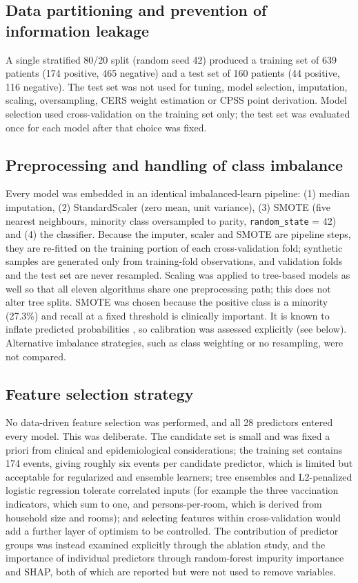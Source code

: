 \documentclass[a4paper,fleqn]{cas-dc}
\begin{document}
\subsection{Data partitioning and prevention of information leakage}
\label{sec:part}

A single stratified 80/20 split (random seed 42) produced a training set of 639 patients (174 positive, 465 negative) and a test set of 160 patients (44 positive, 116 negative). The test set was not used for tuning, model selection, imputation, scaling, oversampling, CERS weight estimation or CPSS point derivation. Model selection used cross-validation on the training set only; the test set was evaluated once for each model after that choice was fixed.

\subsection{Preprocessing and handling of class imbalance}
\label{sec:prep}

Every model was embedded in an identical imbalanced-learn pipeline: (1) median imputation, (2) StandardScaler (zero mean, unit variance), (3) SMOTE \cite{r17} (five nearest neighbours, minority class oversampled to parity, \texttt{random\_\allowbreak state} = 42) and (4) the classifier. Because the imputer, scaler and SMOTE are pipeline steps, they are re-fitted on the training portion of each cross-validation fold; synthetic samples are generated only from training-fold observations, and validation folds and the test set are never resampled. Scaling was applied to tree-based models as well so that all eleven algorithms share one preprocessing path; this does not alter tree splits. SMOTE was chosen because the positive class is a minority (27.3\%) and recall at a fixed threshold is clinically important. It is known to inflate predicted probabilities \cite{r30}, so calibration was assessed explicitly (see below). Alternative imbalance strategies, such as class weighting or no resampling, were not compared.

\subsection{Feature selection strategy}
\label{sec:fsel}

No data-driven feature selection was performed, and all 28 predictors entered every model. This was deliberate. The candidate set is small and was fixed a priori from clinical and epidemiological considerations; the training set contains 174 events, giving roughly six events per candidate predictor, which is limited but acceptable for regularized and ensemble learners; tree ensembles and L2-penalized logistic regression tolerate correlated inputs (for example the three vaccination indicators, which sum to one, and persons-per-room, which is derived from household size and rooms); and selecting features within cross-validation would add a further layer of optimism to be controlled. The contribution of predictor groups was instead examined explicitly through the ablation study, and the importance of individual predictors through random-forest impurity importance and SHAP, both of which are reported but were not used to remove variables.
\end{document}
